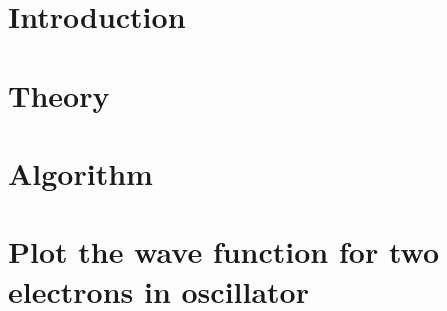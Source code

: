 \documentclass[a4paper,english]{article}
\author{Kristoffer Brækken, Vedad Hodzic, Paul Magnus
Sørensen-Clark}
\begin{document}
\begin{titlepage}
    \thispagestyle{empty}
    
\end{titlepage}

\section{Introduction}


\section{Theory}


\section{Algorithm}


\section{Plot the wave function for two electrons in oscillator}

\end{document}
